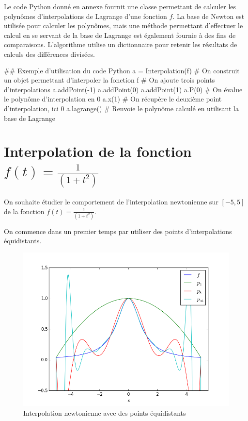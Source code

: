 Le code Python donné en annexe fournit une classe  permettant de calculer les polynômes 
d'interpolations de Lagrange d'une fonction $f$. 
La base de Newton est utilisée pour calculer les polynômes, mais une 
méthode permettant d'effectuer le calcul en se servant de la  
base de Lagrange est également fournie à des fins 
de comparaisons. L'algorithme utilise un dictionnaire pour 
retenir les résultats de calculs des différences divisées. 


\begin{codeblock}
## Exemple d'utilisation du code Python
a = Interpolation(f) # On construit un objet permettant d'interpoler la fonction f
# On ajoute trois points d'interpolations
a.addPoint(-1)
a.addPoint(0)
a.addPoint(1)
a.P(0) # On évalue le polynôme d'interpolation en 0
a.x(1) # On récupère le deuxième point d'interpolation, ici 0
a.lagrange() # Renvoie le polynôme calculé en utilisant la base de Lagrange
\end{codeblock}


\section{Interpolation de la fonction $f(t) = \frac{1}{(1+t^2)}$}

On souhaite étudier le comportement de l'interpolation 
newtonienne sur $[-5,5]$ de la fonction $f(t) = \frac{1}{(1+t^2)}$. 

On commence dans un premier temps par utiliser des points 
d'interpolations équidistants. 
\begin{figure}[h]
  \centering
  \includegraphics[scale=0.5]{fig1}
  \caption{Interpolation newtonienne avec des points équidistants}
  \label{fig:1:ptsEquidist}
\end{figure}

